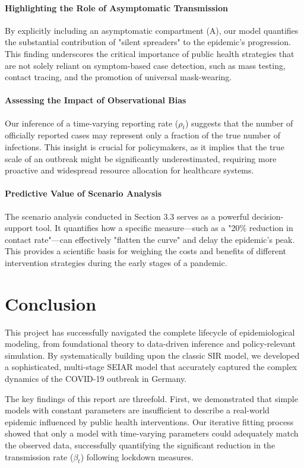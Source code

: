 \documentclass[12pt, a4paper]{article}
\begin{document}
\paragraph{Highlighting the Role of Asymptomatic Transmission} By explicitly including an asymptomatic compartment (A), our model quantifies the substantial contribution of "silent spreaders" to the epidemic's progression. This finding underscores the critical importance of public health strategies that are not solely reliant on symptom-based case detection, such as mass testing, contact tracing, and the promotion of universal mask-wearing.

\paragraph{Assessing the Impact of Observational Bias} Our inference of a time-varying reporting rate ($\rho_t$) suggests that the number of officially reported cases may represent only a fraction of the true number of infections. This insight is crucial for policymakers, as it implies that the true scale of an outbreak might be significantly underestimated, requiring more proactive and widespread resource allocation for healthcare systems.

\paragraph{Predictive Value of Scenario Analysis} The scenario analysis conducted in Section 3.3 serves as a powerful decision-support tool. It quantifies how a specific measure—such as a "20\% reduction in contact rate"—can effectively "flatten the curve" and delay the epidemic's peak. This provides a scientific basis for weighing the costs and benefits of different intervention strategies during the early stages of a pandemic.


\section{Conclusion}
This project has successfully navigated the complete lifecycle of epidemiological modeling, from foundational theory to data-driven inference and policy-relevant simulation. By systematically building upon the classic SIR model, we developed a sophisticated, multi-stage SEIAR model that accurately captured the complex dynamics of the COVID-19 outbreak in Germany.

The key findings of this report are threefold. First, we demonstrated that simple models with constant parameters are insufficient to describe a real-world epidemic influenced by public health interventions. Our iterative fitting process showed that only a model with time-varying parameters could adequately match the observed data, successfully quantifying the significant reduction in the transmission rate ($\beta_t$) following lockdown measures.
\end{document}
